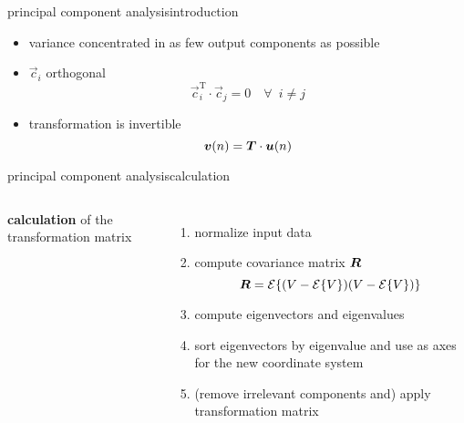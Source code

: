 \begin{frame}{principal component analysis}{introduction}
\begin{itemize}
\begin{itemize}
										\item<2->	variance concentrated in as few output components as possible
										\item<2->	$\vec{c}_i$ orthogonal
														\begin{equation*}
																\vec{c}_i^\mathrm{T}\cdot \vec{c}_j = 0\quad \forall\enspace i \neq j
														\end{equation*}
										\item<2->	transformation is invertible
														\begin{equation*}\label{eq:pca_syn}
																\vec{v}(n) = \mat{T}\cdot\vec{u}(n)
														\end{equation*}
								\end{itemize}
				\end{itemize}
\end{frame}

\begin{frame}{principal component analysis}{calculation}
	\begin{columns}
		\textbf{calculation} of the transformation matrix
		\begin{enumerate}
							\item normalize input data
			\item	compute covariance matrix $\mat{R}$
									\begin{equation*}
					\mat{R} = \mathcal{E}\lbrace(V-\mathcal{E}\lbrace V\rbrace)(V-\mathcal{E}\lbrace V\rbrace)\rbrace%
				\end{equation*}
			\item	compute eigenvectors and eigenvalues
			\item	sort eigenvectors by eigenvalue and use as axes for the new coordinate system
							\item   (remove irrelevant components and) apply transformation matrix
		\end{enumerate}
		
	\end{columns}
\end{frame}

